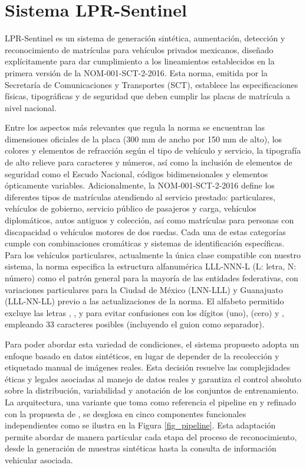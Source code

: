 \section{Sistema LPR-Sentinel}
LPR-Sentinel es un sistema de generación sintética, aumentación, detección y reconocimiento de matrículas para vehículos privados mexicanos, diseñado explícitamente para dar cumplimiento a los lineamientos establecidos en la primera versión de la NOM-001-SCT-2-2016. Esta norma, emitida por la Secretaría de Comunicaciones y Transportes (SCT), establece las especificaciones físicas, tipográficas y de seguridad que deben cumplir las placas de matrícula a nivel nacional.

Entre los aspectos más relevantes que regula la norma se encuentran las dimensiones oficiales de la placa (300 mm de ancho por 150 mm de alto), los colores y elementos de refracción según el tipo de vehículo y servicio, la tipografía de alto relieve para caracteres y números, así como la inclusión de elementos de seguridad como el Escudo Nacional, códigos bidimensionales y elementos ópticamente variables. Adicionalmente, la NOM-001-SCT-2-2016 define los diferentes tipos de matrículas atendiendo al servicio prestado: particulares, vehículos de gobierno, servicio público de pasajeros y carga, vehículos diplomáticos, autos antiguos y colección, así como matrículas para personas con discapacidad o vehículos motores de dos ruedas. Cada una de estas categorías cumple con combinaciones cromáticas y sistemas de identificación específicas. Para los vehículos particulares, actualmente la única clase compatible con nuestro sistema, la norma especifica la estructura alfanumérica LLL-NNN-L (L: letra, N: número) como el patrón general para la mayoría de las entidades federativas, con variaciones particulares para la Ciudad de México (LNN-LLL) y Guanajuato (LLL-NN-LL) previo a las actualizaciones de la norma. El alfabeto permitido excluye las letras , ,  y  para evitar confusiones con los dígitos  (uno),  (cero) y , empleando 33 caracteres posibles (incluyendo el guion \quotes{-} como separador).

Para poder abordar esta variedad de condiciones, el sistema propuesto adopta un enfoque basado en datos sintéticos, en lugar de depender de la recolección y etiquetado manual de imágenes reales. Esta decisión resuelve las complejidades éticas y legales asociadas al manejo de datos reales y garantiza el control absoluto sobre la distribución, variabilidad y anotación de los conjuntos de entrenamiento. La arquitectura, una variante que toma como referencia el pipeline en \cite{islam-afroz2025} y refinado con la propuesta de \cite{fastplateOCR}, se desglosa en cinco componentes funcionales independientes como se ilustra en la Figura \ref{fig_pipeline}. Esta adaptación permite abordar de manera particular cada etapa del proceso de reconocimiento, desde la generación de muestras sintéticas hasta la consulta de información vehicular asociada.%

